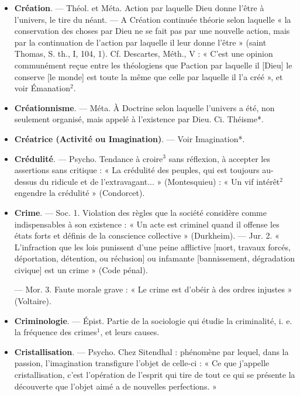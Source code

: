 \begin{itemize}[leftmargin=1cm, label=, itemsep=11pt]
\item {\bf Création}. — Théol. et Méta. Action par
laquelle Dieu donne l'être à l’univers, le tire du néant. — A Création
continuée théorie selon laquelle
« la conservation des choses par
Dieu ne se fait pas par une nouvelle action, mais par la continuation de l’action par laquelle il leur
donne l’être » (saint Thomas, S. th.,
I, 104, 1). Cf. Descartes, Méth., V :
« C'est une opinion communément
reçue entre les théologiens que
Paction par laquelle il [Dieu] le
conserve [le monde] est toute la
même que celle par laquelle il l’a
créé », et voir Émanation$^2$.

\item {\bf Créationnisme}. — Méta. À Doctrine
selon laquelle l'univers a été, non
seulement organisé, mais appelé à
l'existence par Dieu. Ci. Théisme*.

\item {\bf Créatrice (Activité ou Imagination)}.
— Voir Imagination*.

\item {\bf Crédulité}. — Psycho. Tendance à
croire$^3$ sans réflexion, à accepter les
assertions sans critique : « La crédulité des peuples, qui est toujours au-dessus du ridicule et de l’extravagant... » (Montesquieu) : « Un vif
intérêt$^2$ engendre la crédulité »
(Condorcet).

\item {\bf Crime}. — Soc. 1. Violation des règles
que la société considère comme
indispensables à son existence : « Un
acte est criminel quand il offense les
états forts et définis de la conscience
collective » (Durkheim). — Jur.
2. « L’infraction que les lois punissent d’une peine afflictive [mort,
travaux forcés, déportation, détention, ou réclusion] ou infamante
[bannissement, dégradation civique]
est un crime » (Code pénal).

— Mor. 3. Faute morale grave :
« Le crime est d’obéir à des ordres
injustes » (Voltaire).

\item {\bf Criminologie}. — Épist. Partie de la
sociologie qui étudie la criminalité,
i. e. la fréquence des crimes$^1$, et leurs
causes.

\item {\bf Cristallisation}. — Psycho. Chez Sitendhal : phénomène par lequel, dans
la passion, l'imagination transfigure
l’objet de celle-ci : « Ce que j'appelle
cristallisation, c’est l'opération de
l'esprit qui tire de tout ce qui se
présente la découverte que l’objet
aimé a de nouvelles perfections. »


\end{itemize}
